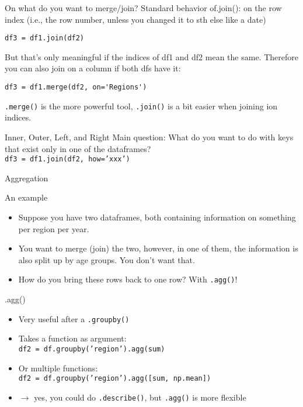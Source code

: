 \begin{frame}[fragile]{On what do you want to merge/join?}
Standard behavior of.join(): on the row index  (i.e., the row number, unless
you changed it to sth else like a date)
\begin{lstlisting}
df3 = df1.join(df2)
\end{lstlisting}
\pause
But that’s only meaningful if the indices of df1 and df2 mean the same. Therefore you can also join on a column if both dfs have it:
\begin{lstlisting}
df3 = df1.merge(df2, on='Regions')
\end{lstlisting}
\pause
\texttt{.merge()} is the more powerful tool, \texttt{.join()} is a bit easier when joining ion indices.
\end{frame}

\begin{frame}[fragile]{Inner, Outer, Left, and Right}
Main question: What do you want to do with keys that exist only in one of the  dataframes? \\
\pause
\vfill
\texttt{df3 = df1.join(df2, how='xxx')}\\
\vfill

\end{frame}



\begin{frame}[plain]
Aggregation
\end{frame}

\begin{frame}{An example}
\begin{itemize}
	\item Suppose you have two dataframes, both containing information on something  per region per year.
	\item 	You want to merge (join) the two, however, in one of them, the information is also split up by age groups. You don’t want that.
	\item 	How do you bring these rows back to one row? With \texttt{.agg()}!
\end{itemize}

\end{frame}


\begin{frame}{.agg()}
\begin{itemize}[<+->]
	\item Very useful after a \texttt{.groupby()}
	\item Takes a function as argument: \\	\texttt{df2 = df.groupby('region').agg(sum)}
	\item Or multiple functions: \\ \texttt{df2 = df.groupby('region').agg([sum, np.mean])}
	\item $\rightarrow$ yes, you could do \texttt{.describe()}, but \texttt{.agg()} is more flexible	
\end{itemize}
\end{frame}


